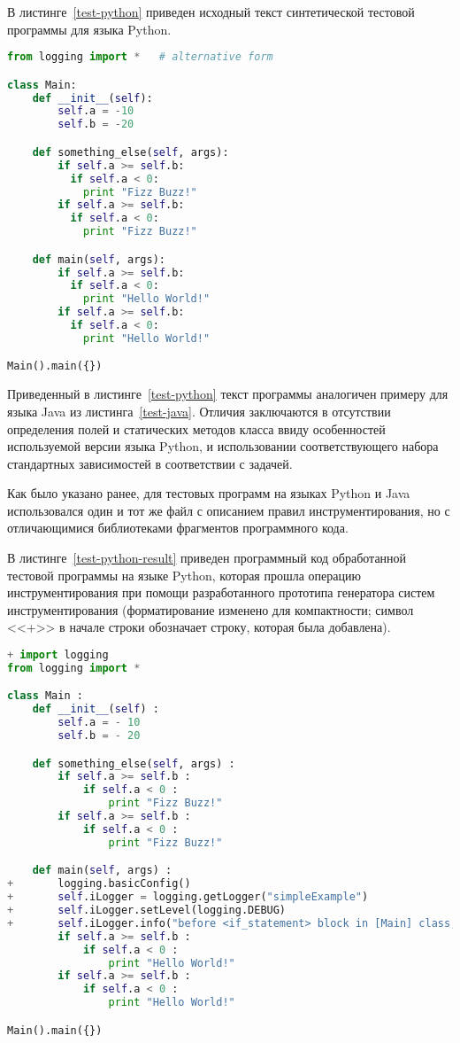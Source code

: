 В листинге~\ref{test-python} приведен исходный текст синтетической тестовой программы для языка Python.

\begin{lstlisting}[frame=single, language=Python, label={test-python}, caption={Исходный текст тестового приложения.}]
from logging import *   # alternative form

class Main:
    def __init__(self):
        self.a = -10
        self.b = -20

    def something_else(self, args):
        if self.a >= self.b:
          if self.a < 0:
            print "Fizz Buzz!"
        if self.a >= self.b:
          if self.a < 0:
            print "Fizz Buzz!"

    def main(self, args):
        if self.a >= self.b:
          if self.a < 0:
            print "Hello World!"
        if self.a >= self.b:
          if self.a < 0:
            print "Hello World!"

Main().main({})
\end{lstlisting}

Приведенный в листинге~\ref{test-python} текст программы аналогичен примеру для языка Java из листинга~\ref{test-java}.
Отличия заключаются в отсутствии определения полей и статических методов класса ввиду особенностей используемой версии языка Python, и использовании соответствующего набора стандартных зависимостей в соответствии с задачей.

Как было указано ранее, для тестовых программ на языках Python и Java использовался один и тот же файл с описанием правил инструментирования, но с отличающимися библиотеками фрагментов программного кода.

В листинге~\ref{test-python-result} приведен программный код обработанной тестовой программы на языке Python, которая прошла операцию инструментирования при помощи разработанного прототипа генератора систем инструментирования (форматирование изменено для компактности; символ <<+>> в начале строки обозначает строку, которая была добавлена).

\begin{lstlisting}[frame=single, language=Python, label={test-python-result}, caption={Текст инструментированного тестового приложения.}]
+ import logging
from logging import *

class Main :
    def __init__(self) :
        self.a = - 10
        self.b = - 20

    def something_else(self, args) :
        if self.a >= self.b :
            if self.a < 0 :
                print "Fizz Buzz!"
        if self.a >= self.b :
            if self.a < 0 :
                print "Fizz Buzz!"

    def main(self, args) :
+       logging.basicConfig()
+       self.iLogger = logging.getLogger("simpleExample")
+       self.iLogger.setLevel(logging.DEBUG)
+       self.iLogger.info("before <if_statement> block in [Main] class, in {main} method")
        if self.a >= self.b :
            if self.a < 0 :
                print "Hello World!"
        if self.a >= self.b :
            if self.a < 0 :
                print "Hello World!"

Main().main({})
\end{lstlisting}

